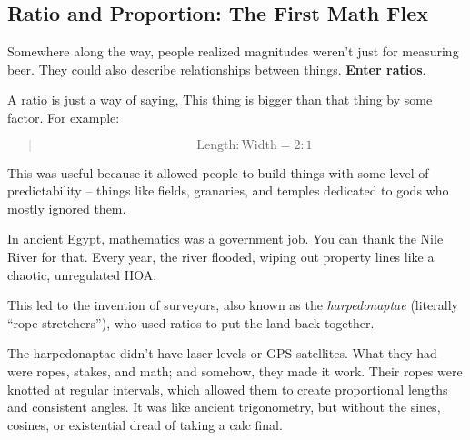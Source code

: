 \subsection{Ratio and Proportion: The First Math Flex}

Somewhere along the way, people realized magnitudes weren’t just for measuring beer. They could also describe relationships between things. \textbf{Enter ratios}.

A ratio is just a way of saying, This thing is bigger than that thing by some factor. For example:

\begin{quote}
\[
\text{Length} : \text{Width} = 2:1
\]
\end{quote} 


This was useful because it allowed people to build things with some level of predictability -- things like fields, granaries, and temples dedicated to gods who mostly ignored them.  

In ancient Egypt, mathematics was a government job. You can thank the Nile River for that. Every year, the river flooded, wiping out property lines like a chaotic, unregulated HOA.  

This led to the invention of surveyors, also known as the \textit{harpedonaptae} (literally “rope stretchers”), who used ratios to put the land back together.  

The harpedonaptae didn’t have laser levels or GPS satellites. What they had were ropes, stakes, and math; and somehow, they made it work. Their ropes were knotted at regular intervals, which allowed them to create proportional lengths and consistent angles. It was like ancient trigonometry, but without the sines, cosines, or existential dread of taking a calc final.

